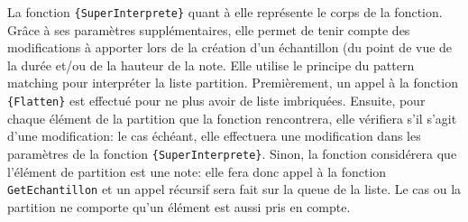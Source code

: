 \documentclass[a4paper,12pt,oneside ]{article}
\begin{document}
	La fonction \texttt{\{SuperInterprete\}} quant à elle représente le corps de la fonction. Grâce à ses paramètres supplémentaires, elle permet de tenir compte des modifications à apporter lors de la création d'un échantillon (du point de vue de la durée et/ou de la hauteur de la note. Elle utilise le principe du pattern matching pour interpréter la liste partition. Premièrement, un appel à la fonction \texttt{\{Flatten\}} est effectué pour ne plus avoir de liste imbriquées. Ensuite, pour chaque élément de la partition que la fonction rencontrera, elle vérifiera s'il s'agit d'une modification: le cas échéant, elle effectuera une modification dans les paramètres de la fonction \texttt{\{SuperInterprete\}}. Sinon, la fonction considérera que l'élément de partition est une note: elle fera donc appel à la fonction \texttt{GetEchantillon} et un appel récursif sera fait sur la queue de la liste. Le cas ou la partition ne comporte qu'un élément est aussi pris en compte.
\end{document}
